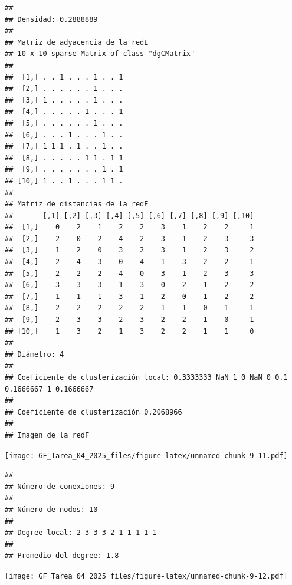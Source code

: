\documentclass[
]{article}
\begin{document}
\begin{verbatim}
## 
## Densidad: 0.2888889 
## 
## Matriz de adyacencia de la redE 
## 10 x 10 sparse Matrix of class "dgCMatrix"
##                          
##  [1,] . . 1 . . . 1 . . 1
##  [2,] . . . . . . 1 . . .
##  [3,] 1 . . . . . 1 . . .
##  [4,] . . . . . 1 . . . 1
##  [5,] . . . . . . 1 . . .
##  [6,] . . . 1 . . . 1 . .
##  [7,] 1 1 1 . 1 . . 1 . .
##  [8,] . . . . . 1 1 . 1 1
##  [9,] . . . . . . . 1 . 1
## [10,] 1 . . 1 . . . 1 1 .
## 
## Matriz de distancias de la redE 
##       [,1] [,2] [,3] [,4] [,5] [,6] [,7] [,8] [,9] [,10]
##  [1,]    0    2    1    2    2    3    1    2    2     1
##  [2,]    2    0    2    4    2    3    1    2    3     3
##  [3,]    1    2    0    3    2    3    1    2    3     2
##  [4,]    2    4    3    0    4    1    3    2    2     1
##  [5,]    2    2    2    4    0    3    1    2    3     3
##  [6,]    3    3    3    1    3    0    2    1    2     2
##  [7,]    1    1    1    3    1    2    0    1    2     2
##  [8,]    2    2    2    2    2    1    1    0    1     1
##  [9,]    2    3    3    2    3    2    2    1    0     1
## [10,]    1    3    2    1    3    2    2    1    1     0
## 
## Diámetro: 4 
## 
## Coeficiente de clusterización local: 0.3333333 NaN 1 0 NaN 0 0.1 0.1666667 1 0.1666667 
## 
## Coeficiente de clusterización 0.2068966 
## 
## Imagen de la redF
\end{verbatim}

\texttt{[image: GF\_Tarea\_04\_2025\_files/figure-latex/unnamed-chunk-9-11.pdf]}

\begin{verbatim}
## 
## Número de conexiones: 9 
## 
## Número de nodos: 10 
## 
## Degree local: 2 3 3 3 2 1 1 1 1 1 
## 
## Promedio del degree: 1.8
\end{verbatim}

\texttt{[image: GF\_Tarea\_04\_2025\_files/figure-latex/unnamed-chunk-9-12.pdf]}
\end{document}
